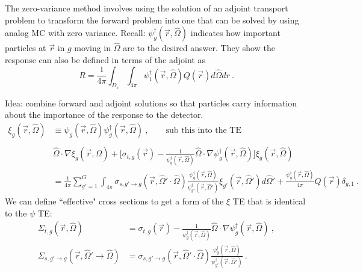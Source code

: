 \documentclass[12pt,twoside]{article}
\newcommand{\vOmega}{\ensuremath{\hat{\Omega}}}
\begin{document}
The zero-variance method involves using the solution of an adjoint transport problem to transform the forward problem into one that can be solved by using analog MC with zero variance. Recall: $\psi_g^{\dagger}(\vec{r}, \vOmega)$ indicates how important particles at $\vec{r}$ in $g$ moving in $\vOmega$ are to the desired answer. They show the response can also be defined in terms of the adjoint as
\begin{equation}
  R = \frac{1}{4 \pi} \int_{D_s} \int_{4\pi} \psi^{\dagger}_{1}(\vec{r}, \vOmega) Q(\vec{r}) d\vOmega dr \:. 
 \label{eq:adjResponse}
\end{equation}

Idea: combine forward and adjoint solutions so that particles carry information about the importance of the response to the detector.
\begin{align}
  \xi_g(\vec{r}, \vOmega) &\equiv \psi_g(\vec{r}, \vOmega)\psi_g^{\dagger}(\vec{r}, \vOmega) \:, \qquad \text{sub this into the TE}\\
  &\nonumber\\
  &\vOmega \cdot \nabla \xi_g(\vec{r}, \vOmega) + 
  \bigl[ \sigma_{t,g}(\vec{r}) - \frac{1}{\psi_g^{\dagger}(\vec{r}, \vOmega)}\vOmega \cdot \nabla \psi_g^{\dagger}(\vec{r}, \vOmega) \bigr] \xi_g(\vec{r}, \vOmega) \nonumber \\
  &= \frac{1}{4 \pi} \sum_{g'=1}^{G} \int_{4 \pi} \sigma_{s, g' \rightarrow g}(\vec{r}, \vOmega' \cdot \vOmega) \frac{\psi_g^{\dagger}(\vec{r}, \vOmega)}{\psi_{g'}^{\dagger}(\vec{r}, \vOmega')} \xi_{g'}(\vec{r}, \vOmega') d \vOmega' 
  + \frac{\psi_g^{\dagger}(\vec{r}, \vOmega)}{4 \pi} Q(\vec{r}) \delta_{g,1} \:.
\end{align}
We can define ``effective" cross sections to get a form of the $\xi$ TE that is identical to the $\psi$ TE:
\begin{align}
  \Sigma_{t,g}(\vec{r}, \vOmega) &= \sigma_{t,g}(\vec{r}) - \frac{1}{\psi_g^{\dagger}(\vec{r}, \vOmega)}\vOmega \cdot \nabla \psi_g^{\dagger}(\vec{r}, \vOmega) \:, \label{eq:effectiveSigT} \\
  \Sigma_{s,g' \rightarrow g}(\vec{r}, \vOmega' \rightarrow \vOmega) &= \sigma_{s, g' \rightarrow g}(\vec{r}, \vOmega' \cdot \vOmega) \frac{\psi_g^{\dagger}(\vec{r}, \vOmega)}{\psi_{g'}^{\dagger}(\vec{r}, \vOmega')} \:. \label{eq:effectiveSigS}
\end{align}
\end{document}
